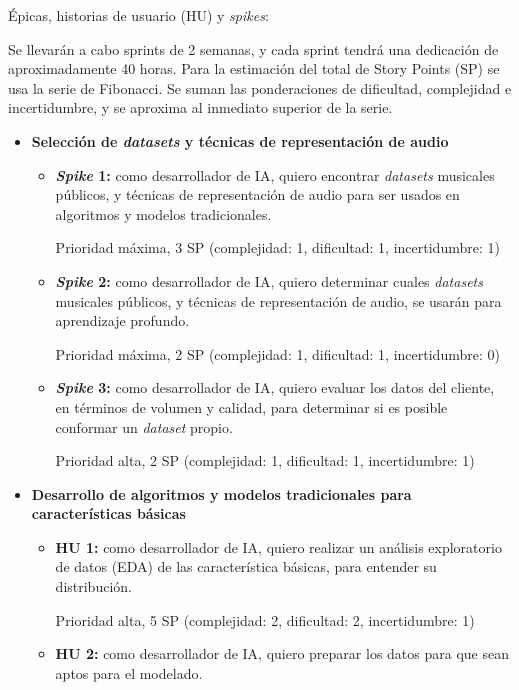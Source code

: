 \documentclass[
11pt, %
]{charter}
\begin{document}
Épicas, historias de usuario (HU) y \textit{spikes}:

Se llevarán a cabo sprints de 2 semanas, y cada sprint tendrá una dedicación de aproximadamente 40 horas. Para la estimación del total de Story Points (SP) se usa la serie de Fibonacci. Se suman las ponderaciones de dificultad, complejidad e incertidumbre, y se aproxima al inmediato superior de la serie.

\begin{itemize}
  \item \textbf{Selección de \textit{datasets} y técnicas de representación de audio}
    \begin{itemize}
      \item \textbf{\textit{Spike} 1:}
      como desarrollador de IA, quiero encontrar \textit{datasets} musicales públicos, y técnicas de representación de audio para ser usados en algoritmos y modelos tradicionales.
      
      Prioridad máxima, 3 SP (complejidad: 1, dificultad: 1, incertidumbre: 1)
      \item \textbf{\textit{Spike} 2:}
      como desarrollador de IA, quiero determinar cuales \textit{datasets} musicales públicos, y técnicas de representación de audio, se usarán para aprendizaje profundo.      
      
      Prioridad máxima, 2 SP (complejidad: 1, dificultad: 1, incertidumbre: 0)
      \item \textbf{\textit{Spike} 3:}
      como desarrollador de IA, quiero evaluar los datos del cliente, en términos de volumen y calidad, para determinar si es posible conformar un \textit{dataset} propio.
      
      Prioridad alta, 2 SP (complejidad: 1, dificultad: 1, incertidumbre: 1)
      \vspace{2cm}
    \end{itemize}
  \vspace{2cm}
  \item \textbf{Desarrollo de algoritmos y modelos tradicionales para características básicas}
    \begin{itemize}
      \item \textbf{HU 1:}
      como desarrollador de IA, quiero realizar un análisis exploratorio de datos (EDA) de las característica básicas, para entender su distribución.
      
      Prioridad alta, 5 SP (complejidad: 2, dificultad: 2, incertidumbre: 1)
      \item \textbf{HU 2:}
      como desarrollador de IA, quiero preparar los datos para que sean aptos para el modelado.
      

\end{itemize}
\end{itemize}
\end{document}
